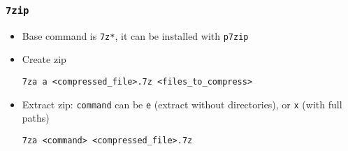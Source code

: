 \documentclass[a4paper,12pt,%
              final%
              ]{article}
\begin{document}
\subsubsection{\texttt{7zip}}
\begin{itemize}
  \item Base command is \texttt{7z*}, it can be installed with \texttt{p7zip}
  \item Create zip
\begin{verbatim}
7za a <compressed_file>.7z <files_to_compress>
\end{verbatim}
  \item Extract zip: \texttt{command} can be \texttt{e} (extract without directories), or \texttt{x} (with full paths)
\begin{verbatim}
7za <command> <compressed_file>.7z
\end{verbatim}
\end{itemize}

\end{document}
